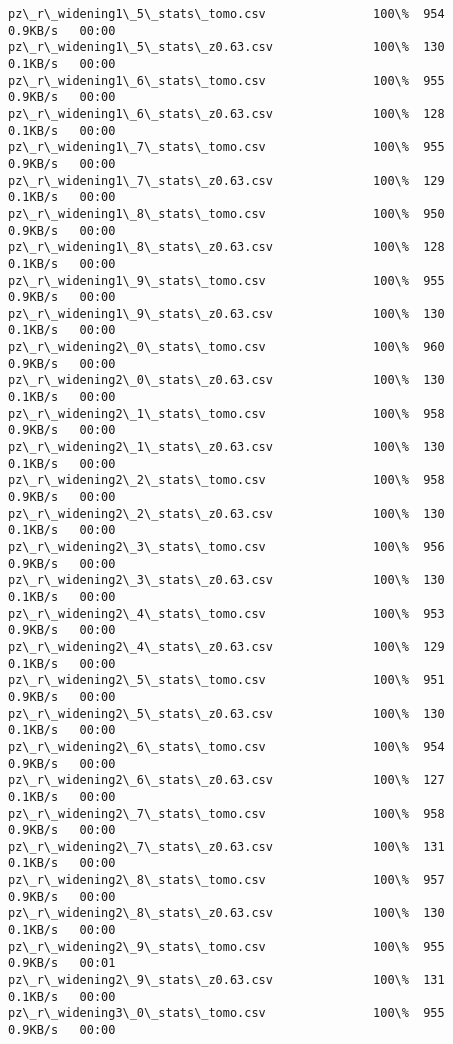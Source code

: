 \documentclass[11pt]{article}
\begin{document}
\begin{Verbatim}[commandchars=\\\{\}]
pz\_r\_widening1\_5\_stats\_tomo.csv               100\%  954     0.9KB/s   00:00    
pz\_r\_widening1\_5\_stats\_z0.63.csv              100\%  130     0.1KB/s   00:00    
pz\_r\_widening1\_6\_stats\_tomo.csv               100\%  955     0.9KB/s   00:00    
pz\_r\_widening1\_6\_stats\_z0.63.csv              100\%  128     0.1KB/s   00:00    
pz\_r\_widening1\_7\_stats\_tomo.csv               100\%  955     0.9KB/s   00:00    
pz\_r\_widening1\_7\_stats\_z0.63.csv              100\%  129     0.1KB/s   00:00    
pz\_r\_widening1\_8\_stats\_tomo.csv               100\%  950     0.9KB/s   00:00    
pz\_r\_widening1\_8\_stats\_z0.63.csv              100\%  128     0.1KB/s   00:00    
pz\_r\_widening1\_9\_stats\_tomo.csv               100\%  955     0.9KB/s   00:00    
pz\_r\_widening1\_9\_stats\_z0.63.csv              100\%  130     0.1KB/s   00:00    
pz\_r\_widening2\_0\_stats\_tomo.csv               100\%  960     0.9KB/s   00:00    
pz\_r\_widening2\_0\_stats\_z0.63.csv              100\%  130     0.1KB/s   00:00    
pz\_r\_widening2\_1\_stats\_tomo.csv               100\%  958     0.9KB/s   00:00    
pz\_r\_widening2\_1\_stats\_z0.63.csv              100\%  130     0.1KB/s   00:00    
pz\_r\_widening2\_2\_stats\_tomo.csv               100\%  958     0.9KB/s   00:00    
pz\_r\_widening2\_2\_stats\_z0.63.csv              100\%  130     0.1KB/s   00:00    
pz\_r\_widening2\_3\_stats\_tomo.csv               100\%  956     0.9KB/s   00:00    
pz\_r\_widening2\_3\_stats\_z0.63.csv              100\%  130     0.1KB/s   00:00    
pz\_r\_widening2\_4\_stats\_tomo.csv               100\%  953     0.9KB/s   00:00    
pz\_r\_widening2\_4\_stats\_z0.63.csv              100\%  129     0.1KB/s   00:00    
pz\_r\_widening2\_5\_stats\_tomo.csv               100\%  951     0.9KB/s   00:00    
pz\_r\_widening2\_5\_stats\_z0.63.csv              100\%  130     0.1KB/s   00:00    
pz\_r\_widening2\_6\_stats\_tomo.csv               100\%  954     0.9KB/s   00:00    
pz\_r\_widening2\_6\_stats\_z0.63.csv              100\%  127     0.1KB/s   00:00    
pz\_r\_widening2\_7\_stats\_tomo.csv               100\%  958     0.9KB/s   00:00    
pz\_r\_widening2\_7\_stats\_z0.63.csv              100\%  131     0.1KB/s   00:00    
pz\_r\_widening2\_8\_stats\_tomo.csv               100\%  957     0.9KB/s   00:00    
pz\_r\_widening2\_8\_stats\_z0.63.csv              100\%  130     0.1KB/s   00:00    
pz\_r\_widening2\_9\_stats\_tomo.csv               100\%  955     0.9KB/s   00:01    
pz\_r\_widening2\_9\_stats\_z0.63.csv              100\%  131     0.1KB/s   00:00    
pz\_r\_widening3\_0\_stats\_tomo.csv               100\%  955     0.9KB/s   00:00    

\end{Verbatim}
\end{document}
